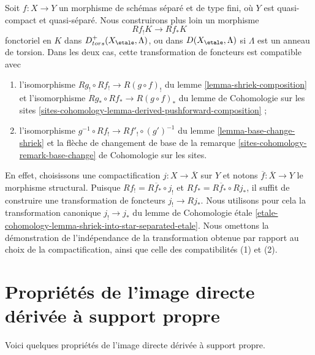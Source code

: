 \begin{remark}
\label{remark-shriek-to-star}
Soit $f : X \to Y$ un morphisme de schémas séparé et de type fini,
où $Y$ est quasi-compact et quasi-séparé. Nous construirons plus loin
un morphisme
$$
Rf_!K \longrightarrow Rf_*K
$$
fonctoriel en $K$ dans $D^+_{tors}(X_\etale, \Lambda)$, ou dans
$D(X_\etale, \Lambda)$ si $\Lambda$ est un anneau de torsion. Dans les deux cas, cette transformation
de foncteurs est compatible avec
\begin{enumerate}
\item l'isomorphisme $Rg_! \circ Rf_! \to R(g \circ f)_!$ du
lemme \ref{lemma-shriek-composition} et l'isomorphisme
$Rg_* \circ Rf_* \to R(g \circ f)_*$ du
lemme de Cohomologie sur les sites
\ref{sites-cohomology-lemma-derived-pushforward-composition} ;
\item l'isomorphisme $g^{-1} \circ Rf_! \to Rf'_! \circ (g')^{-1}$
du lemme \ref{lemma-base-change-shriek}
et la flèche de changement de base de la
remarque \ref{sites-cohomology-remark-base-change} de Cohomologie sur les sites.
\end{enumerate}
En effet, choisissons une compactification $j : X \to \overline{X}$ sur $Y$
et notons $\overline{f} : \overline{X} \to Y$ le morphisme structural.
Puisque $Rf_! = R\overline{f}_* \circ j_!$ et
$Rf_* = R\overline{f}_* \circ Rj_*$, il suffit de construire une
transformation de foncteurs $j_! \to Rj_*$. Nous utilisons pour cela la
transformation canonique $j_! \to j_*$ du
lemme de Cohomologie étale
\ref{etale-cohomology-lemma-shriek-into-star-separated-etale}.
Nous omettons la démonstration de l'indépendance de la transformation obtenue
par rapport au choix de la compactification, ainsi que celle des
compatibilités (1) et (2).
\end{remark}













\section{Propriétés de l'image directe dérivée à support propre}
\label{section-derived-lower-shriek-properties}

\noindent
Voici quelques propriétés de l'image directe dérivée à support propre.

